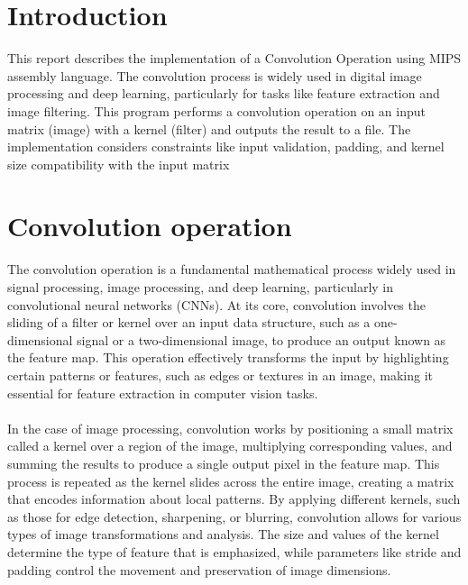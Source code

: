 \documentclass[a4paper]{article}
\begin{document}
\setcounter{page}{0}
\thispagestyle{empty}
\newpage
\tableofcontents
\newpage

\section{Introduction}
This report describes the implementation of a Convolution Operation using MIPS
assembly language. The convolution process is widely used in digital image processing
and deep learning, particularly for tasks like feature extraction and image filtering. This
program performs a convolution operation on an input matrix (image) with a kernel
(filter) and outputs the result to a file. The implementation considers constraints like
input validation, padding, and kernel size compatibility with the input matrix 
\section{Convolution operation}
The convolution operation is a fundamental mathematical process widely used in signal processing, image processing, and deep learning, particularly in convolutional neural networks (CNNs). At its core, convolution involves the sliding of a filter or kernel over an input data structure, such as a one-dimensional signal or a two-dimensional image, to produce an output known as the feature map. This operation effectively transforms the input by highlighting certain patterns or features, such as edges or textures in an image, making it essential for feature extraction in computer vision tasks.\\ \\
In the case of image processing, convolution works by positioning a small matrix called a kernel over a region of the image, multiplying corresponding values, and summing the results to produce a single output pixel in the feature map. This process is repeated as the kernel slides across the entire image, creating a matrix that encodes information about local patterns. By applying different kernels, such as those for edge detection, sharpening, or blurring, convolution allows for various types of image transformations and analysis. The size and values of the kernel determine the type of feature that is emphasized, while parameters like stride and padding control the movement and preservation of image dimensions.
   
\end{document}
